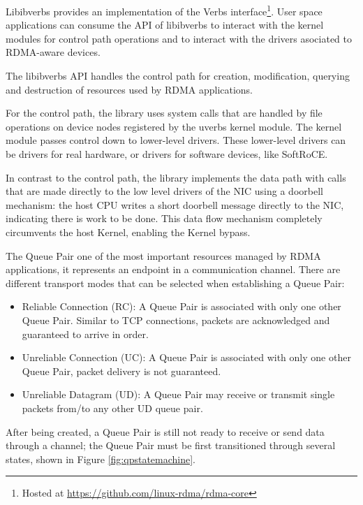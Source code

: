 Libibverbs provides an implementation of the Verbs interface\footnote{Hosted at \url{https://github.com/linux-rdma/rdma-core}}. User space
applications can consume the API of libibverbs to interact with
the kernel modules for control path operations and to interact with the drivers asociated
to RDMA-aware devices.

The libibverbs API handles the control path for creation, modification, querying and destruction of resources used by RDMA applications.

For the control path, the library uses system calls that are handled by file operations on device nodes
registered by the uverbs kernel module. The kernel module passes control down to lower-level drivers.
These lower-level drivers can be drivers for real hardware, or drivers for software devices, like SoftRoCE.

In contrast to the control path,  the library implements the data path with calls that are made
directly to the low level drivers of the NIC using a doorbell mechanism: the host CPU %
writes a short doorbell message directly to the
NIC, indicating there is work to be done\cite{KaliaUsingRDMAEfficiently2014}. This data flow mechanism completely circumvents the
host Kernel, enabling the Kernel bypass\cite{kaliaDesignGuidelinesHigh2016}.

The Queue Pair one of the most important resources managed by RDMA applications, it represents an endpoint
in a communication channel. There are different transport modes that can be selected when establishing a Queue Pair\cite{rdmamanual}:

\begin{itemize}
  \item Reliable Connection (RC): A Queue Pair is associated with only one other Queue Pair. Similar to TCP connections, packets are acknowledged and guaranteed to arrive in order.
  \item Unreliable Connection (UC): A Queue Pair is associated with only one other Queue Pair, packet delivery is not guaranteed.
  \item Unreliable Datagram (UD): A Queue Pair may receive or transmit single packets from/to any other UD queue pair.
\end{itemize}

After being created, a Queue Pair is still not ready to receive or send data through a channel; the Queue Pair must be first
transitioned through several states, shown in Figure \ref{fig:qpstatemachine}.

